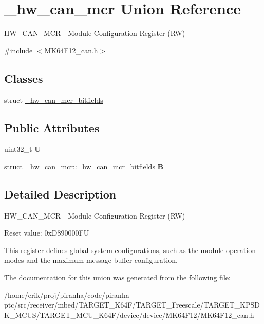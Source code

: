 \hypertarget{union__hw__can__mcr}{}\section{\+\_\+hw\+\_\+can\+\_\+mcr Union Reference}
\label{union__hw__can__mcr}


H\+W\+\_\+\+C\+A\+N\+\_\+\+M\+CR -\/ Module Configuration Register (RW)  




{\ttfamily \#include $<$M\+K64\+F12\+\_\+can.\+h$>$}

\subsection*{Classes}
\begin{DoxyCompactItemize}
\item 
struct \hyperlink{struct__hw__can__mcr_1_1__hw__can__mcr__bitfields}{\+\_\+hw\+\_\+can\+\_\+mcr\+\_\+bitfields}
\end{DoxyCompactItemize}
\subsection*{Public Attributes}
\begin{DoxyCompactItemize}
\item 
uint32\+\_\+t {\bfseries U}\hypertarget{union__hw__can__mcr_ac8cf5202f3c6dc2a2bd9aa0bf1d97b48}{}\label{union__hw__can__mcr_ac8cf5202f3c6dc2a2bd9aa0bf1d97b48}

\item 
struct \hyperlink{struct__hw__can__mcr_1_1__hw__can__mcr__bitfields}{\+\_\+hw\+\_\+can\+\_\+mcr\+::\+\_\+hw\+\_\+can\+\_\+mcr\+\_\+bitfields} {\bfseries B}\hypertarget{union__hw__can__mcr_a6f498b501dadb4ab3b5e68b78f13ed94}{}\label{union__hw__can__mcr_a6f498b501dadb4ab3b5e68b78f13ed94}

\end{DoxyCompactItemize}


\subsection{Detailed Description}
H\+W\+\_\+\+C\+A\+N\+\_\+\+M\+CR -\/ Module Configuration Register (RW) 

Reset value\+: 0x\+D890000\+FU

This register defines global system configurations, such as the module operation modes and the maximum message buffer configuration. 

The documentation for this union was generated from the following file\+:\begin{DoxyCompactItemize}
\item 
/home/erik/proj/piranha/code/piranha-\/ptc/src/receiver/mbed/\+T\+A\+R\+G\+E\+T\+\_\+\+K64\+F/\+T\+A\+R\+G\+E\+T\+\_\+\+Freescale/\+T\+A\+R\+G\+E\+T\+\_\+\+K\+P\+S\+D\+K\+\_\+\+M\+C\+U\+S/\+T\+A\+R\+G\+E\+T\+\_\+\+M\+C\+U\+\_\+\+K64\+F/device/device/\+M\+K64\+F12/M\+K64\+F12\+\_\+can.\+h\end{DoxyCompactItemize}
